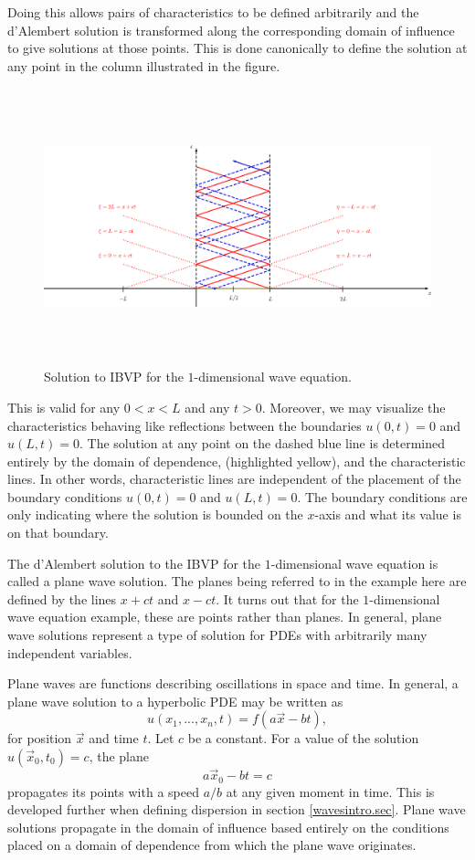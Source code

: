 \documentclass[12pt]{article}
\theoremstyle{definition}
\numberwithin{equation}{section}
\begin{document}
{Doing this allows pairs of characteristics to be defined arbitrarily and the d'Alembert solution is transformed along the corresponding domain of influence to give solutions at those points. This is done canonically to define the solution at any point in the column illustrated in the figure.
\begin{figure}[h!]
\centerline{\includegraphics[height = 80mm, width=180mm, angle=0]{IBVP2.eps}}
\caption{Solution to IBVP for the $1$-dimensional wave equation.}
\label{figure_IBVP2}
\end{figure}

This is valid for any $0<x<L$ and any $t>0$. Moreover, we may visualize the characteristics behaving like reflections between the boundaries $u(0,t)=0$ and $u(L,t)=0$. The solution at any point on the dashed blue line is determined entirely by the domain of dependence, (highlighted yellow), and the characteristic lines. In other words, characteristic lines are independent of the placement of the boundary conditions $u(0,t)=0$ and $u(L,t)=0$. The boundary conditions are only indicating where the solution is bounded on the $x$-axis and what its value is on that boundary.

The d'Alembert solution to the IBVP for the $1$-dimensional wave equation is called a plane wave solution. The planes being referred to in the example here are defined by the lines $x+ct$ and $x-ct$. It turns out that for the $1$-dimensional wave equation example, these are points rather than planes. In general, plane wave solutions represent a type of solution for PDEs with arbitrarily many independent variables.

Plane waves are functions describing oscillations in space and time. In general, a plane wave solution to a hyperbolic PDE may be written as
$$u(x_1,...,x_n,t)=f\left(a \vec{x}-bt\right),$$
for position $\vec{x}$ and time $t$.
Let $c$ be a constant. For a value of the solution $u( \vec{x}_0,t_0)=c$, the plane
$$a\vec{x}_0-bt=c$$
propagates its points with a speed $a\slash b$ at any given moment in time. This is developed further when defining dispersion in section \ref{wavesintro.sec}. Plane wave solutions propagate in the domain of influence based entirely on the conditions placed on a domain of dependence from which the plane wave originates.

}
\end{document}
